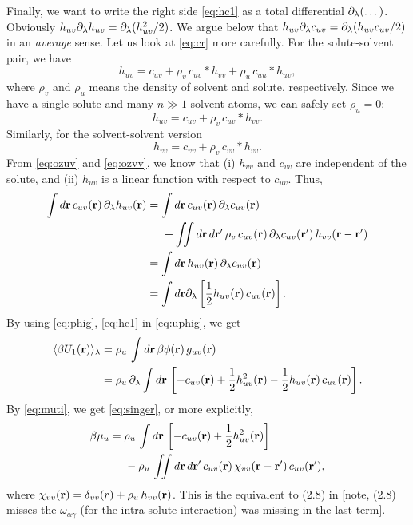 \documentclass{article}
\begin{document}
Finally, we want to write the right side \eqref{eq:hc1} as
a total differential $\partial_\lambda(\dots)$.
%
Obviously $h_{uv} \partial_\lambda h_{uv} = \partial_\lambda ( h_{uv}^2/2 )$.
%
We argue below that $h_{uv} \partial_\lambda c_{uv} = \partial_\lambda ( h_{uv} c_{uv} /2) $
in an \emph{average} sense.
Let us look at \eqref{eq:cr} more carefully.
%
For the solute-solvent pair, we have
\[
  h_{uv} = c_{uv} + \rho_v \, c_{uv}*h_{vv}
  + \rho_u \, c_{uu}*h_{uv},
\]
where $\rho_v$ and $\rho_u$ means the density of
solvent and solute, respectively.
%
Since we have a single solute and many $n \gg 1$ solvent atoms,
we can safely set $\rho_u = 0$:
\begin{equation}
  h_{uv} = c_{uv} + \rho_v \, c_{uv}*h_{vv}.
  \label{eq:ozuv}
\end{equation}
Similarly, for the solvent-solvent version
\begin{equation}
  h_{vv} = c_{vv} + \rho_v \, c_{vv}*h_{vv}.
  \label{eq:ozvv}
\end{equation}
From \eqref{eq:ozuv} and \eqref{eq:ozvv}, we know that
  (i) $h_{vv}$ and $c_{vv}$ are independent of the solute,
  and
  (ii) $h_{uv}$ is a linear function with respect to $c_{uv}$.
%
Thus,
\begin{align}
  \int d\mathbf{r} \, c_{uv}(\mathbf{r}) \, \partial_\lambda h_{uv}(\mathbf{r})
  &=
  \int d\mathbf{r} \,
  c_{uv}(\mathbf{r}) \, \partial_\lambda c_{uv}(\mathbf{r}) \notag \\
  & \;\;\;\;\;
    +
    \iint d\mathbf{r} \, d\mathbf{r}'
    \, \rho_v
    \, c_{uv}(\mathbf{r})
    \, \partial_\lambda c_{uv}(\mathbf{r}') \, h_{vv}(\mathbf{r} - \mathbf{r}') \notag \\
  &= \int d\mathbf{r} \, h_{uv}(\mathbf{r}) \, \partial_\lambda c_{uv}(\mathbf{r}) \notag \\
  &= \int d\mathbf{r} \partial_\lambda
    \left[
      \frac{1}{2} h_{uv}(\mathbf{r}) \,  c_{uv}(\mathbf{r})
    \right].
  \label{eq:phig}
\end{align}
%
By using \eqref{eq:phig}, \eqref{eq:hc1} in \eqref{eq:uphig}, we get
%
\begin{align*}
  \langle
  \beta U_1(\mathbf{r})
  \rangle_\lambda
  &=
  \rho_u \,
  \int d \mathbf{r}
  \, \beta \phi(\mathbf{r}) \, g_{uv}(\mathbf{r}) \\
  &=
   \rho_u \, \partial_\lambda \int d \mathbf{r} \,
   \left[
    - c_{uv}(\mathbf{r})
    + \frac{1}{2} h_{uv}^2(\mathbf{r})
    - \frac{1}{2} h_{uv}(\mathbf{r}) \, c_{uv}(\mathbf{r})
    \right].
  \end{align*}
%
%
%
By \eqref{eq:muti}, we get \eqref{eq:singer}, or more explicitly,
\begin{align}
  \beta \mu_u
  &=
   \rho_u \, \int
    d \mathbf{r} \,
   \left[
    - c_{uv}(\mathbf{r})
    + \frac{1}{2} h_{uv}^2(\mathbf{r})
    \right]
  \notag \\
  & \;\;\;\;\;
    -
    \rho_u \, \iint d\mathbf{r} \, d\mathbf{r}'
    \, c_{uv}(\mathbf{r})
    \, \chi_{vv}(\mathbf{r} - \mathbf{r}')
    \, c_{uv}(\mathbf{r}'),
 \label{eq:muexpanded}
\end{align}
where
$\chi_{vv}(\mathbf{r}) = \delta_{vv}(r) + \rho_u \, h_{vv}(\mathbf{r})$.
%
This is the equivalent to (2.8) in \cite{singer}
[note,
(2.8) misses the $\omega_{\alpha\gamma}$ (for the intra-solute interaction)
was missing in the last term].
\end{document}
